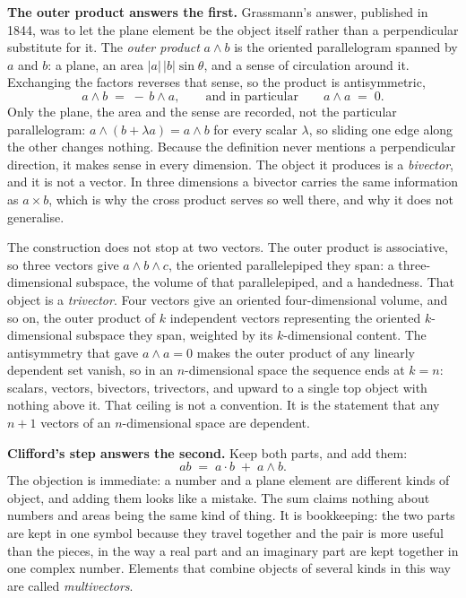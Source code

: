 \documentclass[11pt]{article}
\theoremstyle{definition}
\theoremstyle{plain}
\begin{document}
\label{c:note.primer.setting-products-vectors-one-rule-3}
\textbf{The outer product answers the first.} Grassmann's answer, published in 1844, was to let the plane element be the object itself rather than a perpendicular substitute for it. The \emph{outer product} $a \wedge b$ is the oriented parallelogram spanned by $a$ and $b$: a plane, an area $|a|\,|b| \sin\theta$, and a sense of circulation around it. Exchanging the factors reverses that sense, so the product is antisymmetric,
\[
a \wedge b \;=\; -\, b \wedge a , \qquad \text{and in particular} \qquad a \wedge a \;=\; 0 .
\]
Only the plane, the area and the sense are recorded, not the particular parallelogram: $a \wedge (b + \lambda a) = a \wedge b$ for every scalar $\lambda$, so sliding one edge along the other changes nothing. Because the definition never mentions a perpendicular direction, it makes sense in every dimension. The object it produces is a \emph{bivector}, and it is not a vector. In three dimensions a bivector carries the same information as $a \times b$, which is why the cross product serves so well there, and why it does not generalise.

The construction does not stop at two vectors. The outer product is associative, so three vectors give $a \wedge b \wedge c$, the oriented parallelepiped they span: a three-dimensional subspace, the volume of that parallelepiped, and a handedness. That object is a \emph{trivector}. Four vectors give an oriented four-dimensional volume, and so on, the outer product of $k$ independent vectors representing the oriented $k$-dimensional subspace they span, weighted by its $k$-dimensional content. The antisymmetry that gave $a \wedge a = 0$ makes the outer product of any linearly dependent set vanish, so in an $n$-dimensional space the sequence ends at $k = n$: scalars, vectors, bivectors, trivectors, and upward to a single top object with nothing above it. That ceiling is not a convention. It is the statement that any $n+1$ vectors of an $n$-dimensional space are dependent.

\label{c:note.primer.setting-products-vectors-one-rule-4}
\textbf{Clifford's step answers the second.} Keep both parts, and add them:
\[
ab \;=\; a \cdot b \;+\; a \wedge b .
\]
The objection is immediate: a number and a plane element are different kinds of object, and adding them looks like a mistake. The sum claims nothing about numbers and areas being the same kind of thing. It is bookkeeping: the two parts are kept in one symbol because they travel together and the pair is more useful than the pieces, in the way a real part and an imaginary part are kept together in one complex number. Elements that combine objects of several kinds in this way are called \emph{multivectors}.
\end{document}
